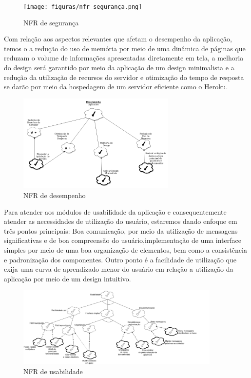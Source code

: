 \begin{figure}[H]
    \centering
    \texttt{[image: figuras/nfr\_segurança.png]}
    \caption{NFR de segurança}
    \label{fig:nfr-seguranca}
\end{figure}

Com relação aos aspectos relevantes que afetam o desempenho da aplicação, temos o a redução do uso de memória por meio de uma dinâmica de páginas que reduzam o volume de informações apresentadas diretamente em tela, a melhoria do design será garantido por meio da aplicação de um design minimalista e a redução da utilização de recursos do servidor e otimização do tempo de resposta se darão por meio da hospedagem de um servidor eficiente como o Heroku.

\begin{figure}[H]
    \centering
    \includegraphics[width=0.7\textwidth]{figuras/NFR_Desempenho.png}
    \caption{NFR de desempenho}
    \label{fig:nfr-desempenho}
\end{figure}

Para atender aos módulos de usabilidade da aplicação e consequentemente atender as necessidades de utilização do usuário, estaremos dando enfoque em três pontos principais: Boa comunicação, por meio da utilização de mensagens significativas e de boa compreensão do usuário,implementação de uma interface simples por meio de uma boa organização de elementos, bem como a consistência e padronização dos componentes. Outro ponto é a facilidade de utilização que exija uma curva de aprendizado menor do usuário em relação a utilização da aplicação por meio de um design intuitivo.
\begin{figure}[H]
    \centering
    \includegraphics[width=0.9\textwidth]{figuras/nfr_usabilidade_pill.png}
    \caption{NFR de usabilidade}
    \label{fig:nfr-usabilidade}
\end{figure}

